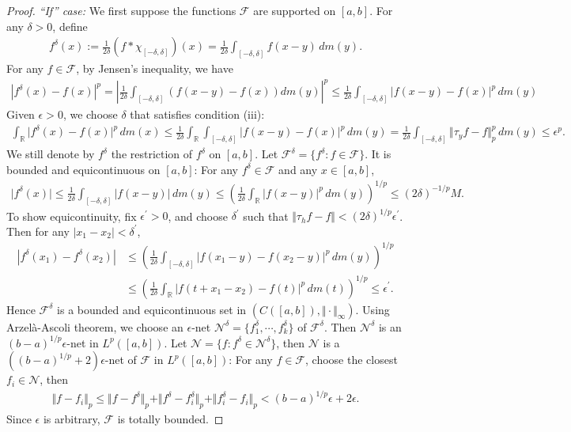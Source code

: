 \documentclass{article}
\begin{document}
\begin{proof}
\textit{``If'' case:} We first suppose the functions $\mathcal{F}$ are supported on $[a,b]$. For any $\delta>0$, define
\begin{align*}
	f^\delta(x):= \frac{1}{2\delta}(f*\chi_{[-\delta,\delta]})(x) = \frac{1}{2\delta}\int_{[-\delta,\delta]} f(x-y)\,dm(y).
\end{align*}
For any $f\in\mathcal{F}$, by Jensen's inequality, we have
\begin{align*}
	\left\vert f^\delta(x) - f(x)\right\vert^p = \left\vert\frac{1}{2\delta}\int_{[-\delta,\delta]}\left(f(x-y)-f(x)\right) dm(y)\right\vert^p \leq \frac{1}{2\delta}\int_{[-\delta,\delta]} \left\vert f(x-y)-f(x)\right\vert^p\,dm(y)
\end{align*}
Given $\epsilon>0$, we choose $\delta$ that satisfies condition (iii):
\begin{align*}
	\int_\mathbb{R}\vert f^\delta(x)-f(x)\vert^p\,dm(x) \leq \frac{1}{2\delta}\int_\mathbb{R}\int_{[-\delta,\delta]}\vert f(x-y)-f(x)\vert^p\,dm(y) = \frac{1}{2\delta}\int_{[-\delta,\delta]}\Vert\tau_y f-f\Vert_p^p\,dm(y) \leq \epsilon^p.
\end{align*}
We still denote by $f^\delta$ the restriction of $f^\delta$ on $[a,b]$. Let $\mathcal{F}^\delta = \{f^\delta:f\in\mathcal{F}\}$. It is bounded and equicontinuous on $[a,b]$: For any $f^\delta\in\mathcal{F}$ and any $x\in[a,b]$,
\begin{align*}
	\vert f^\delta(x)\vert \leq \frac{1}{2\delta}\int_{[-\delta,\delta]} \vert f(x-y)\vert\,dm(y) \leq \left(\frac{1}{2\delta}\int_\mathbb{R} \vert f(x-y)\vert^p\,dm(y)\right)^{1/p}\leq (2\delta)^{-1/p}M.
\end{align*}
To show equicontinuity, fix $\epsilon^\prime>0$, and choose $\delta^\prime$ such that $\Vert\tau_h f-f\Vert < (2\delta)^{1/p}\epsilon^\prime$. Then for any $\vert x_1-x_2\vert < \delta^\prime$,
\begin{align*}
	\left\vert f^\delta(x_1) - f^\delta(x_2)\right\vert &\leq \left(\frac{1}{2\delta}\int_{[-\delta,\delta]} \left\vert f(x_1-y) - f(x_2-y)\right\vert^p\,dm(y)\right)^{1/p}\\
	&\leq \left(\frac{1}{2\delta}\int_\mathbb{R} \left\vert f(t + x_1 -x_2 ) - f(t)\right\vert^p\,dm(t)\right)^{1/p}
	\leq \epsilon^\prime.
\end{align*}
Hence $\mathcal{F}^\delta$ is a bounded and equicontinuous set in $(C([a,b]),\Vert\cdot\Vert_\infty)$. Using Arzelà-Ascoli theorem, we choose an $\epsilon$-net $\mathcal{N}^\delta=\{f_1^\delta,\cdots,f_k^\delta\}$ of $\mathcal{F}^\delta$. Then $\mathcal{N}^\delta$ is an $(b-a)^{1/p}\epsilon$-net in $L^p([a,b])$. Let $\mathcal{N}=\{f:f^\delta\in\mathcal{N}^\delta\}$, then $\mathcal{N}$ is a $\left((b-a)^{1/p}+2\right)\epsilon$-net of $\mathcal{F}$ in $L^p([a,b])$: For any $f\in\mathcal{F}$, choose the closest $f_i\in\mathcal{N}$, then
\begin{align*}
	\Vert f-f_i\Vert_p \leq \Vert f - f^\delta\Vert_p + \Vert f^\delta - f^\delta_i\Vert_p + \Vert f_i^\delta - f_i\Vert_p < (b-a)^{1/p}\epsilon + 2\epsilon.
\end{align*}
Since $\epsilon$ is arbitrary, $\mathcal{F}$ is totally bounded.
\vspace{0.1cm}


\end{proof}
\end{document}
